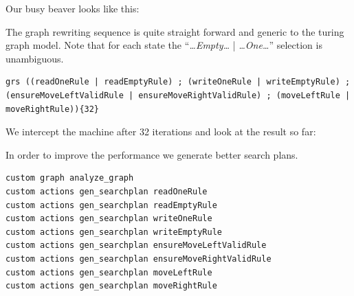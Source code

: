 \documentclass[a4paper,11pt]{report}
\begin{document}
Our busy beaver looks like this:
\begin{center}
\end{center}
The graph rewriting sequence is quite straight forward and generic to the turing graph model. Note that for each state the ``\emph{\dots Empty\dots} | \emph{\dots One\dots}'' selection is unambiguous.
\begin{lstlisting}[name=bb]
  grs ((readOneRule | readEmptyRule) ; (writeOneRule | writeEmptyRule) ; (ensureMoveLeftValidRule | ensureMoveRightValidRule) ; (moveLeftRule | moveRightRule)){32}
\end{lstlisting}
We intercept the machine after 32 iterations and look at the result so far:
\begin{center}
\end{center}
In order to improve the performance we generate better search plans.
\begin{lstlisting}[name=bb]
custom graph analyze_graph
custom actions gen_searchplan readOneRule
custom actions gen_searchplan readEmptyRule
custom actions gen_searchplan writeOneRule
custom actions gen_searchplan writeEmptyRule
custom actions gen_searchplan ensureMoveLeftValidRule
custom actions gen_searchplan ensureMoveRightValidRule
custom actions gen_searchplan moveLeftRule
custom actions gen_searchplan moveRightRule
\end{lstlisting}
\end{document}
